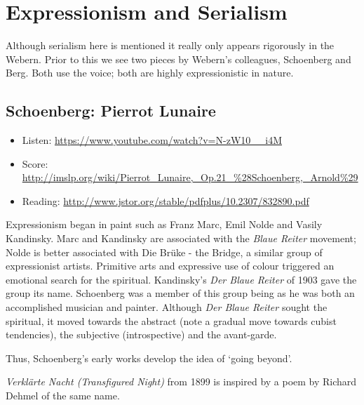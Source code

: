
\chapter{Expressionism and Serialism}
\label{twentieth}

Although serialism here is mentioned it really only appears rigorously in the Webern. 
Prior to this we see two pieces by Webern's colleagues, Schoenberg and Berg.
Both use the voice; both are highly expressionistic in nature. 


\section{Schoenberg: Pierrot Lunaire}
\begin{itemize}
\item Listen: \url{https://www.youtube.com/watch?v=N-zW10__i4M}
\item Score: \url{http://imslp.org/wiki/Pierrot_Lunaire,_Op.21_%28Schoenberg,_Arnold%29}
\item Reading: \url{http://www.jstor.org/stable/pdfplus/10.2307/832890.pdf}
\end{itemize}

Expressionism began in paint such as Franz Marc, Emil Nolde and Vasily Kandinsky. Marc and Kandinsky are associated with the \textit{Blaue Reiter} movement; Nolde is better associated with Die Br\"uke - the Bridge, a similar group of expressionist artists. Primitive arts and expressive use of colour triggered an emotional search for the spiritual. Kandinsky's \textit{Der Blaue Reiter} of 1903 gave the group its name. Schoenberg was a member of this group being as he was both an accomplished musician and painter. Although \textit{Der Blaue Reiter} sought the spiritual, it moved towards the abstract (note a gradual move towards cubist tendencies), the subjective (introspective) and the avant-garde. 

Thus, Schoenberg's early works develop the idea of `going beyond'. 

\textit{Verkl\"arte Nacht (Transfigured Night)} from 1899 is inspired by a poem by Richard Dehmel of the same name. 

